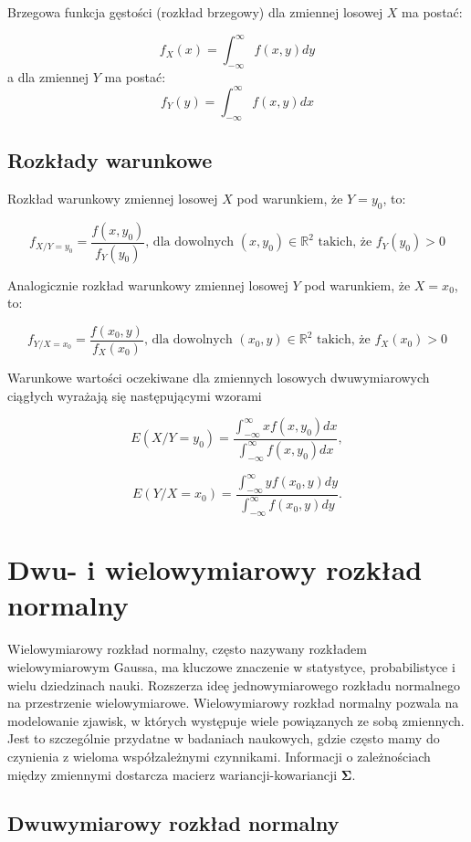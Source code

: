 \documentclass[
  letterpaper,
  DIV=11,
  numbers=noendperiod]{scrreprt}
\begin{document}
Brzegowa funkcja gęstości (rozkład brzegowy) dla zmiennej losowej \(X\)
ma postać:

\[f_X(x)=\int_{-\infty}^{\infty}f(x,y)dy\] a dla zmiennej \(Y\) ma
postać: \[f_Y(y)=\int_{-\infty}^{\infty}f(x,y)dx\]

\subsection{Rozkłady warunkowe}\label{rozkux142ady-warunkowe-1}

Rozkład warunkowy zmiennej losowej \(X\) pod warunkiem, że \(Y=y_0\),
to:

\[f_{X/Y=y_0}=\frac{f(x,y_0)}{f_Y(y_0)} \text{, dla dowolnych } (x,y_0) \in \mathbb{R}^2 \text{ takich, że } f_Y(y_0)>0\]

Analogicznie rozkład warunkowy zmiennej losowej \(Y\) pod warunkiem, że
\(X=x_0\), to:

\[f_{Y/X=x_0}=\frac{f(x_0,y)}{f_X(x_0)} \text{, dla dowolnych } (x_0,y) \in \mathbb{R}^2 \text{ takich, że } f_X(x_0)>0\]

Warunkowe wartości oczekiwane dla zmiennych losowych dwuwymiarowych
ciągłych wyrażają się następującymi wzorami

\[ E(X/Y=y_0) = \frac{ \int_{-\infty}^{\infty} x f(x,y_0)dx  }{\int_{-\infty}^{\infty} f(x,y_0)dx},\]

\[ E(Y/X=x_0) = \frac{ \int_{-\infty}^{\infty} y f(x_0,y)dy  }{\int_{-\infty}^{\infty} f(x_0,y)dy}.\]

\section{Dwu- i wielowymiarowy rozkład
normalny}\label{dwu--i-wielowymiarowy-rozkux142ad-normalny}

Wielowymiarowy rozkład normalny, często nazywany rozkładem
wielowymiarowym Gaussa, ma kluczowe znaczenie w statystyce,
probabilistyce i wielu dziedzinach nauki. Rozszerza ideę
jednowymiarowego rozkładu normalnego na przestrzenie wielowymiarowe.
Wielowymiarowy rozkład normalny pozwala na modelowanie zjawisk, w
których występuje wiele powiązanych ze sobą zmiennych. Jest to
szczególnie przydatne w badaniach naukowych, gdzie często mamy do
czynienia z wieloma współzależnymi czynnikami. Informacji o
zależnościach między zmiennymi dostarcza macierz wariancji-kowariancji
\(\boldsymbol{\Sigma}\).

\subsection{Dwuwymiarowy rozkład
normalny}\label{dwuwymiarowy-rozkux142ad-normalny}
\end{document}
